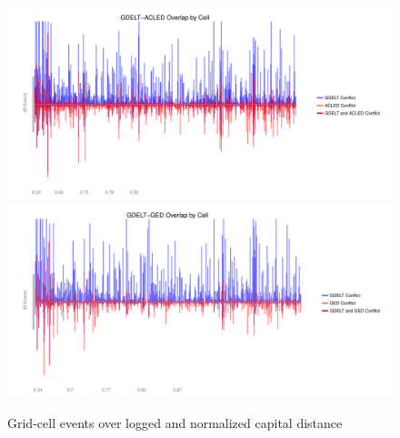\documentclass[hidelinks]{article}
\begin{document}
\begin{figure}[!htbp]
\includegraphics[width = 1 \textwidth]{spaceACLEDAppendixBPermissive.pdf}\\
\includegraphics[width = 1 \textwidth]{spaceGEDAppendixBPermissive.pdf}
\caption{Grid-cell events over logged and normalized capital distance}\label{fig:correlations_space}
\end{figure}
\newpage
\end{document}
